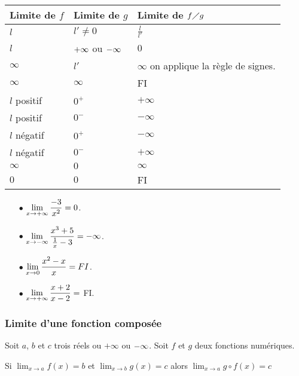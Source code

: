 \begin{tabularx}{\textwidth}{|X|X|X|}
\hline
Limite de $ f $ & Limite de $ g $ &Limite de $ f\diagup g $ \\
\hline
$ l $& $ l'\neq 0 $&$ \frac{l}{l'} $ \\
\hline
 $ l $& $ +\infty$  ou  $ -\infty $& $ 0 $\\
\hline
$ \infty $& $l' $& $ \infty $ \scriptsize{on applique la règle de signes.}\\
\hline

$ \infty $& $ \infty $& FI\\
\hline
$ l$ \scriptsize{positif}& $ 0^{+} $& $+ \infty $ \\
\hline
$ l$ \scriptsize{positif}& $ 0^{-} $& $ -\infty $ \\
\hline
$ l$ \scriptsize{négatif}& $ 0^{+} $& $- \infty $ \\
\hline
$ l$ \scriptsize{négatif}& $ 0^{-} $& $ +\infty $ \\
\hline
$ \infty $& $ 0 $& $ \infty $ \\
\hline

$ 0 $& $ 0 $& FI\\
\hline
\end{tabularx}
\begin{example}
\begin{itemize}
\item[$ \bullet $ ] $ \displaystyle \lim_{x\to +\infty}\frac{-3}{x^{2}}=0 $.
\item[$ \bullet $ ] $ \displaystyle \lim_{x\to -\infty}\frac{x^{3}+5}{\frac{1}{x}-3} =-\infty$.
\item[$ \bullet $ ]$ \displaystyle \lim_{x\to 0}\frac{x^{2}-x}{x} =FI$.
\item[$ \bullet $ ] $ \displaystyle \lim_{x\to +\infty}\frac{x+2}{x-2} =$  FI.
\end{itemize}
\end{example}


\subsubsection*{Limite d'une fonction composée}
\begin{property}
Soit $a $, $ b $ et  $ c$ trois réels  ou $ +\infty $  ou $ -\infty $.  Soit   $f$  et $g$ deux fonctions numériques.
 
Si \; $ \lim_{x \to a} f(x)=b $ \;  et  \;  $ \lim_{x \to b}g(x)=c  $ \; alors\;  $\lim_{x \to a} g\circ f(x)=c $
\end{property}


